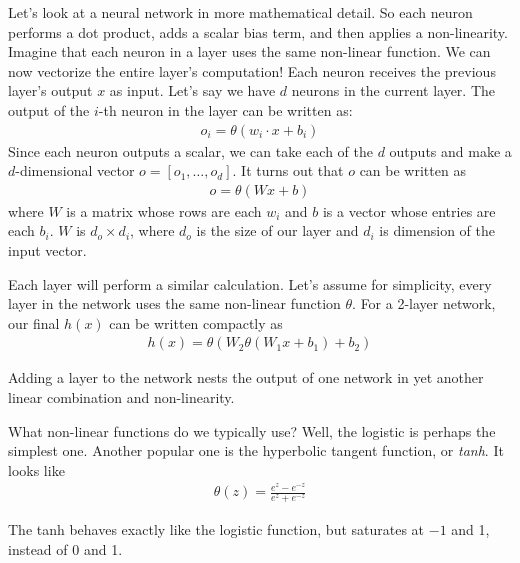 \documentclass[a4paper,10pt]{article}
\begin{document}
Let's look at a neural network
in more mathematical detail.
So each neuron
performs a dot product, adds a scalar bias
term, and then applies a non-linearity.
Imagine that each neuron in a layer
uses the same non-linear function.
We can now vectorize
the entire layer's computation!
Each neuron receives the previous layer's output $x$
as input.
Let's say we have $d$ neurons in the current layer.
The output of the $i$-th neuron
in the layer can be written as:
\begin{align*}
  o_i = \theta(w_i \cdot x + b_i)
\end{align*}
Since each neuron outputs a scalar,
we can take each of the $d$ outputs
and make a $d$-dimensional vector
$o = [o_1, \ldots, o_d]$.
It turns out that $o$ can be written as
\begin{align*}
  o = \theta(Wx + b)
\end{align*}
where $W$ is a matrix
whose rows are each $w_i$
and $b$ is a vector
whose entries are each $b_i$.
$W$ is $d_o \times d_i$,
where $d_o$ is the size of our layer 
and $d_i$ is dimension
of the input vector.

Each layer will perform a similar
calculation. Let's assume
for simplicity, every layer in the network
uses the same non-linear function $\theta$.
For a 2-layer network,
our final $h(x)$ can be written compactly as
\begin{align*}
  h(x) = \theta(W_2\theta(W_1x + b_1) + b_2)
\end{align*}

Adding a layer to the network nests the output
of one network in yet another
linear combination and non-linearity.

What non-linear functions do we typically use?
Well, the logistic is perhaps the simplest one.
Another popular one is the hyperbolic tangent function,
or \emph{tanh}. It looks like
\begin{align*}
  \theta(z) = \frac{e^z - e^{-z}}{e^z + e^{-z}}
\end{align*}

The tanh behaves exactly like the logistic function,
but saturates at $-1$ and 1, instead of 0 and 1.


\end{document}
